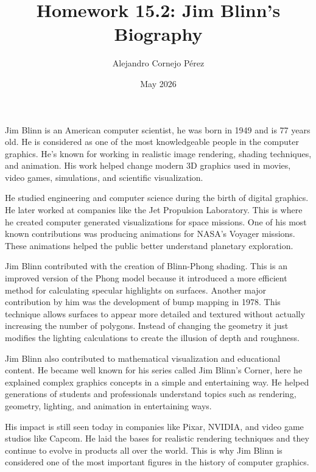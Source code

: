 \documentclass[11pt]{article}
\title{Homework 15.2: Jim Blinn's Biography}
\author{Alejandro Cornejo Pérez}
\date{May 2026}
\begin{document}
\maketitle
Jim Blinn is an American computer scientist, he was born in 1949 and is 77 years old. He is considered as one of the most knowledgeable people in the computer graphics. He's known for working in realistic image rendering, shading techniques, and animation. His work helped change modern 3D graphics used in movies, video games, simulations, and scientific visualization.

He studied engineering and computer science during the birth of digital graphics. He later worked at companies like the Jet Propulsion Laboratory. This is where he created computer generated visualizations for space missions. One of his most known contributions was producing animations for NASA’s Voyager missions. These animations helped the public better understand planetary exploration.

Jim Blinn contributed with the creation of Blinn-Phong shading. This is an improved version of the Phong model because it introduced a more efficient method for calculating specular highlights on surfaces. Another major contribution by him was the development of bump mapping in 1978. This technique allows surfaces to appear more detailed and textured without actually increasing the number of polygons. Instead of changing the geometry it just modifies the lighting calculations to create the illusion of depth and roughness.

Jim Blinn also contributed to mathematical visualization and educational content. He became well known for his series called Jim Blinn’s Corner, here he explained complex graphics concepts in a simple and entertaining way. He helped generations of students and professionals understand topics such as rendering, geometry, lighting, and animation in entertaining ways.

His impact is still seen today in companies like Pixar, NVIDIA, and video game studios like Capcom. He laid the bases for realistic rendering techniques and they continue to evolve in products all over the world. This is why Jim Blinn is considered one of the most important figures in the history of computer graphics.
\end{document}
